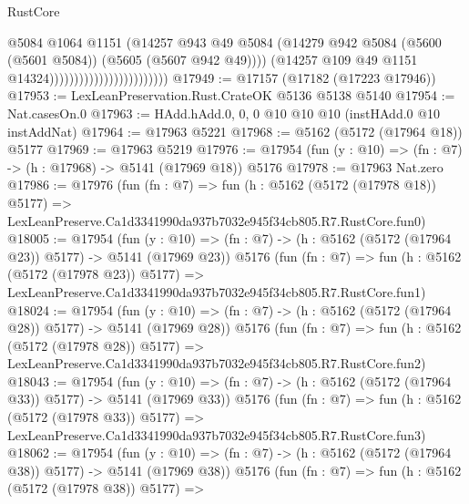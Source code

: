 \begin{lexlean}{RustCore}
\begin{coremodule}
                                                  @5084
                                                  @1064
                                                  @1151
                                                  (@14257
                                                    @943
                                                    @49
                                                    @5084
                                                    (@14279
                                                      @942
                                                      @5084
                                                      (@5600 (@5601 @5084))
                                                      (@5605 (@5607 @942 @49))))
                                                  (@14257
                                                    @109
                                                    @49
                                                    @1151
                                                    @14324))))))))))))))))))))))))
@17949 := @17157 (@17182 (@17223 @17946))
@17953 := LexLeanPreservation.Rust.CrateOK @5136 @5138 @5140
@17954 := Nat.casesOn.{0}
@17963 := HAdd.hAdd.{0, 0, 0} @10 @10 @10 (instHAdd.{0} @10 instAddNat)
@17964 := @17963 @5221
@17968 := @5162 (@5172 (@17964 @18)) @5177
@17969 := @17963 @5219
@17976 := @17954 (fun (y : @10) => (fn : @7) -> (h : @17968) -> @5141 (@17969 @18)) @5176
@17978 := @17963 Nat.zero
@17986 := @17976
    (fun (fn : @7) =>
    fun (h : @5162 (@5172 (@17978 @18)) @5177) =>
    LexLeanPreserve.Ca1d3341990da937b7032e945f34cb805.R7.RustCore.fun0)
@18005 := @17954
    (fun (y : @10) => (fn : @7) -> (h : @5162 (@5172 (@17964 @23)) @5177) -> @5141 (@17969 @23))
    @5176
    (fun (fn : @7) =>
    fun (h : @5162 (@5172 (@17978 @23)) @5177) =>
    LexLeanPreserve.Ca1d3341990da937b7032e945f34cb805.R7.RustCore.fun1)
@18024 := @17954
    (fun (y : @10) => (fn : @7) -> (h : @5162 (@5172 (@17964 @28)) @5177) -> @5141 (@17969 @28))
    @5176
    (fun (fn : @7) =>
    fun (h : @5162 (@5172 (@17978 @28)) @5177) =>
    LexLeanPreserve.Ca1d3341990da937b7032e945f34cb805.R7.RustCore.fun2)
@18043 := @17954
    (fun (y : @10) => (fn : @7) -> (h : @5162 (@5172 (@17964 @33)) @5177) -> @5141 (@17969 @33))
    @5176
    (fun (fn : @7) =>
    fun (h : @5162 (@5172 (@17978 @33)) @5177) =>
    LexLeanPreserve.Ca1d3341990da937b7032e945f34cb805.R7.RustCore.fun3)
@18062 := @17954
    (fun (y : @10) => (fn : @7) -> (h : @5162 (@5172 (@17964 @38)) @5177) -> @5141 (@17969 @38))
    @5176
    (fun (fn : @7) =>
    fun (h : @5162 (@5172 (@17978 @38)) @5177) =>

\end{coremodule}
\end{lexlean}
